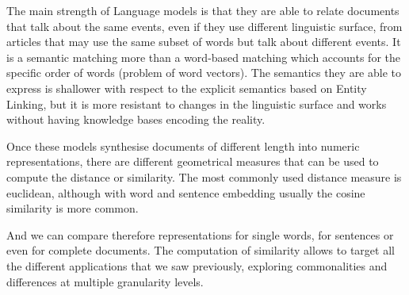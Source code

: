 The main strength of Language models is that they are able to
relate documents that talk about the same events, even if they use different linguistic surface, from articles that may use the same subset of words but talk about different events.
It is a semantic matching more than a word-based matching which accounts for the specific order of words (problem of word vectors). 
The semantics they are able to express
is shallower with respect to the explicit semantics based on Entity Linking, but it is more resistant to changes in the linguistic surface and works without having knowledge bases encoding the reality.










Once these models synthesise documents of different length into numeric representations, there are different geometrical measures that can be used to compute the distance or similarity.
The most commonly used distance measure is euclidean, although with word and sentence embedding usually the cosine similarity is more common.

And we can compare therefore representations for single words, for sentences or even for complete documents.
The computation of similarity allows to target all the different applications that we saw previously, exploring commonalities and differences at multiple granularity levels.







